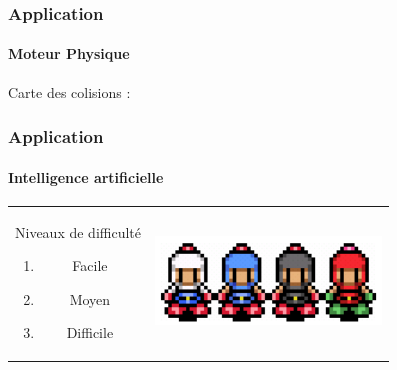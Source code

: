 	
	\begin{frame}
	\frametitle{Application}
	\framesubtitle{Moteur Physique}
	Carte des colisions :
	\begin{center}
	\end{center}
	\end{frame}

	\begin{frame}
	\frametitle{Application}
	\framesubtitle{Intelligence artificielle}
	
		\begin{tabular}{cc}
			\begin{minipage}{4cm}
				Niveaux de difficulté
				\begin{enumerate}
					\item Facile
					\item Moyen
					\item Difficile
				\end{enumerate}
			\end{minipage} &
			\begin{minipage}{6cm}
				\includegraphics[width=6cm]{img/bots.png} 
			\end{minipage}\\
		\end{tabular}
	
	\end{frame}
	
